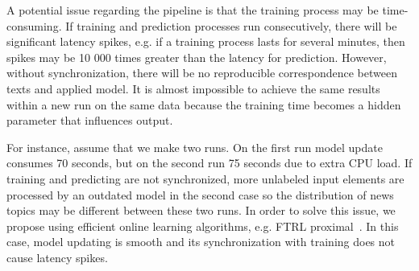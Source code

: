 A potential issue regarding the pipeline is that the training process may be time-consuming. If training and prediction processes run consecutively, there will be significant latency spikes, e.g. if a training process lasts for several minutes, then spikes may be 10 000 times greater than the latency for prediction. However, without synchronization, there will be no reproducible correspondence between texts and applied model. It is almost impossible to achieve the same results within a new run on the same data because the training time becomes a hidden parameter that influences output. 

For instance, assume that we make two runs. On the first run model update consumes 70 seconds, but on the second run 75 seconds due to extra CPU load. If training and predicting are not synchronized, more unlabeled input elements are processed by an outdated model in the second case so the distribution of news topics may be different between these two runs. In order to solve this issue, we propose using efficient online learning algorithms, e.g. FTRL proximal~\cite{mcmahan2013ad}. In this case, model updating is smooth and its synchronization with training does not cause latency spikes.